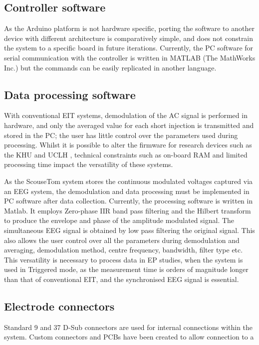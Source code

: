 
\subsection{Controller software}

As the Arduino platform is not hardware specific, porting the software to another device with different architecture is comparatively simple, and does not constrain the system to a specific board in future iterations. Currently, the PC software for serial communication with the controller is written in MATLAB (The MathWorks Inc.) but the commands can be easily replicated in another language.

\subsection{Data processing software}

With conventional EIT systems, demodulation of the AC signal is performed in hardware, and only the averaged value for each short injection is transmitted and stored in the PC; the user has little control over the parameters used during processing. Whilst it is possible to alter the firmware for research devices such as the KHU \cite{Hun_Wi_2014} and UCLH \cite{McEwan_2006}, technical constraints such as on-board RAM and limited processing time impact the versatility of these systems. 

As the ScouseTom system stores the continuous modulated voltages captured via an EEG system, the demodulation and data processing must be implemented in PC software after data collection. Currently, the processing software is written in Matlab. It employs Zero-phase IIR band pass filtering and the Hilbert transform to produce the envelope and phase of the amplitude modulated signal. The simultaneous EEG signal is obtained by low pass filtering the original signal. This also allows the user control over all the parameters during demodulation and averaging, demodulation method, centre frequency, bandwidth, filter type etc. This versatility is necessary to process data in EP studies, when the system is used in Triggered mode, as the measurement time is orders of magnitude longer than that of conventional EIT, and the synchronised EEG signal is essential. 

\subsection{Electrode connectors}

Standard 9 and 37 D-Sub connectors are used for internal connections within the system. Custom connectors and PCBs have been created to allow connection to a range of common electrode interfaces, including EEG electrodes, depth electrodes and Omnetics (Omnetics Connector Corp. MN, USA) devices. Bespoke connectors and cabling can be added to the system for use with non-standard electrode arrays.